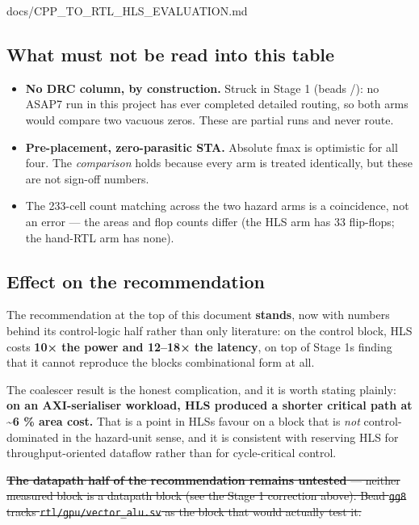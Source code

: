 \begin{relocated}{docs/CPP_TO_RTL_HLS_EVALUATION.md}
\subsection{What must not be read into this table}\label{tm:dec:cpp-to-rtl-hls-evaluation:what-must-not-be-read-into-this-table}

\begin{itemize}
\tightlist
\item
  \textbf{No DRC column, by construction.} Struck in Stage 1 (beads
  /): no ASAP7 run in this project has ever
  completed detailed routing, so both arms would compare two vacuous
  zeros. These are partial runs and never route.
\item
  \textbf{Pre-placement, zero-parasitic STA.} Absolute fmax is
  optimistic for all four. The \emph{comparison} holds because every arm
  is treated identically, but these are not sign-off numbers.
\item
  The 233-cell count matching across the two hazard arms is a
  coincidence, not an error --- the areas and flop counts differ (the
  HLS arm has 33 flip-flops; the hand-RTL arm has none).
\end{itemize}

\subsection{Effect on the recommendation}\label{tm:dec:cpp-to-rtl-hls-evaluation:effect-on-the-recommendation}

The recommendation at the top of this document \textbf{stands}, now with
numbers behind its control-logic half rather than only literature: on
the control block, HLS costs \textbf{10× the power and 12--18× the
latency}, on top of Stage 1\textquotesingle s finding that it cannot
reproduce the block\textquotesingle s combinational form at all.

The coalescer result is the honest complication, and it is worth stating
plainly: \textbf{on an AXI-serialiser workload, HLS produced a shorter
critical path at \textasciitilde6 \% area cost.} That is a point in
HLS\textquotesingle s favour on a block that is \emph{not}
control-dominated in the hazard-unit sense, and it is consistent with
reserving HLS for throughput-oriented dataflow rather than for
cycle-critical control.

\sout{\textbf{The datapath half of the recommendation remains untested}
--- neither measured block is a datapath block (see the Stage 1
correction above). Bead \texttt{gg8} tracks
\texttt{rtl/gpu/vector\_alu.sv} as the block that would actually test
it.}


\end{relocated}

